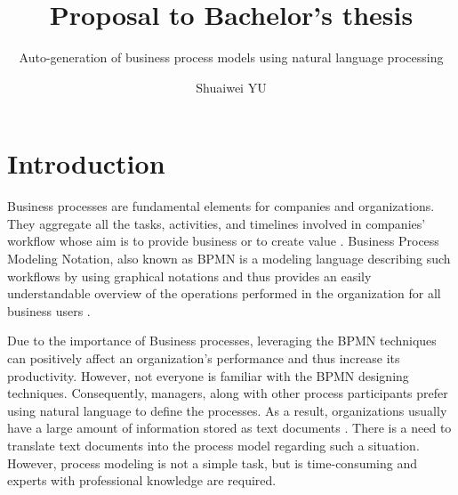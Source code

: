 \documentclass[runningheads]{llncs}
\begin{document}
	\title{Proposal to Bachelor's thesis}
	\subtitle{Auto-generation of business process models using natural language processing}
	\author{Shuaiwei YU  }
	\maketitle


	\section{Introduction}
	Business processes are fundamental elements for companies and organizations. They aggregate all the tasks, activities, and timelines involved in companies' workflow whose aim is to provide business or to create value \cite{literature_review_2}. Business Process Modeling Notation, also known as BPMN is a modeling language describing such workflows by using graphical notations and thus provides an easily understandable overview of the operations performed in the organization for all business users \cite{literature_review_1}. 
	
	Due to the importance of Business processes, leveraging the BPMN techniques can positively affect an organization's performance and thus increase its productivity. However, not everyone is familiar with the BPMN designing techniques. Consequently, managers, along with other process participants prefer using natural language to define the processes. As a result, organizations usually have a large amount of information stored as text documents \cite{literature_review_2}. There is a need to translate text documents into the process model regarding such a situation. However, process modeling is not a simple task, but is time-consuming and experts with professional knowledge are required. 
	
\end{document}
